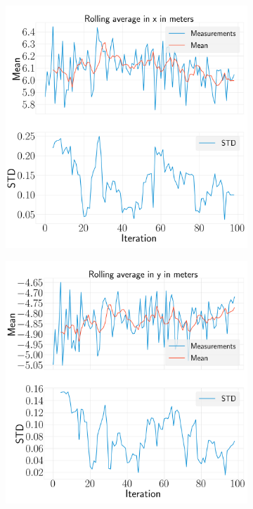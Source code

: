 \documentclass[../Head/report.tex]{subfiles}
\begin{document}
\begin{figure}[H]
    \centering
    \begin{subfigure}[t]{.30\textwidth}
        \centering
        \includegraphics[width=\textwidth]{../Figures/analyse_rolling_average/test2/Calculated_rolling_average_in_x_with_mean_and_STD.png}
        \caption{}
        \label{fig:GPS2Vision_pose_estimation_test2_roll}
    \end{subfigure}
     \hspace{0.2em}
    \begin{subfigure}[t]{.30\textwidth}
        \centering
        \includegraphics[width=\textwidth]{../Figures/analyse_rolling_average/test2/Calculated_rolling_average_in_y_with_mean_and_STD.png}

\end{subfigure}
\end{figure}
\end{document}
